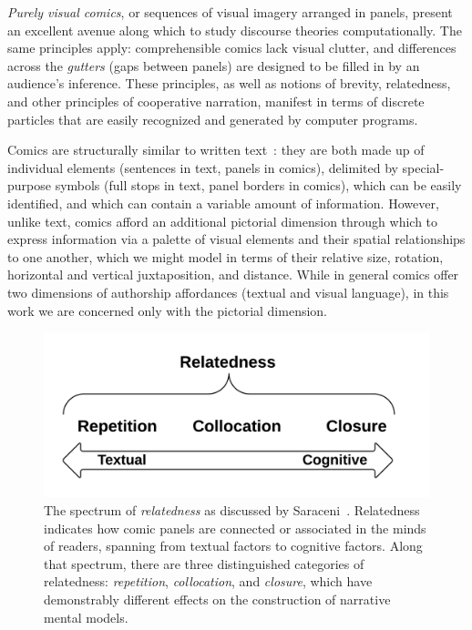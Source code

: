 {\em Purely visual comics}, or sequences of visual imagery arranged in
panels, present an excellent avenue along which to study discourse
theories computationally. 
The same principles apply: comprehensible comics
lack visual clutter, and differences across the {\em gutters} (gaps between
panels) are designed to be filled in by an audience's inference. 
These principles, as well as notions of brevity, relatedness, and other
principles of cooperative narration, manifest in terms of discrete
particles that are easily recognized and generated by computer programs. 

Comics are structurally similar to written
text~\cite{saraceni2016relatedness}: they are both made up of individual
elements (sentences in text, panels in comics), delimited by special-purpose
symbols (full stops in text, panel borders in comics), which can be easily
identified, and which can contain a variable amount of information. However,
unlike text, comics afford an additional pictorial dimension through
which to express information via a palette of visual elements and their spatial
relationships to one another, which we might model in terms of their
relative size, rotation, horizontal and vertical juxtaposition, and
distance. While in general comics offer two dimensions of authorship
affordances (textual and visual language), in this work we are concerned
only with the pictorial dimension.
%
\begin{figure}
	\includegraphics[width=\columnwidth]{relatedness.png}
	\caption{
		The spectrum of \emph{relatedness} as discussed by
                Saraceni~\cite{saraceni2016relatedness}. Relatedness indicates how 
		comic panels are connected or associated in the minds of 
		readers, spanning from textual factors to cognitive factors. 
		Along that spectrum, there are three  distinguished 
		categories of relatedness: \emph{repetition}, 
		\emph{collocation}, and \emph{closure}, which have
		demonstrably different effects on the construction of
		narrative mental models.
		}
	\label{figure:relatedness}
\end{figure}
